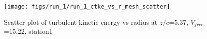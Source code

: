 \begin{figure}[H]
\centering
\texttt{[image: figs/run\_1/run\_1\_ctke\_vs\_r\_mesh\_scatter]}
\caption{Scatter plot of turbulent kinetic energy vs radius at $z/c$=5.37, $V_{free}$=15.22, station1}
\label{fig:run_1_ctke_vs_r_mesh_scatter}
\end{figure}


